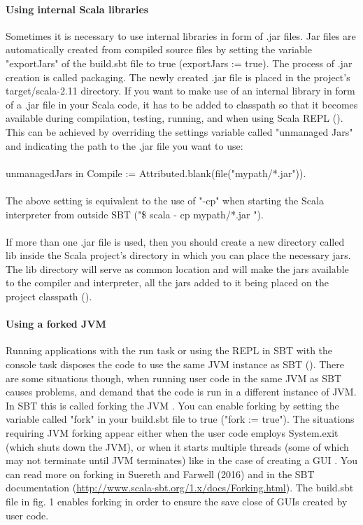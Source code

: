 \documentclass {article}
\begin{document}
\paragraph{Using internal Scala libraries}
Sometimes it is necessary to use internal libraries in form of .jar files.
 Jar files are automatically created from compiled source files by setting the variable "exportJars" of the build.sbt file to true (exportJars := true).
 The process of .jar creation is called packaging.
 The newly created .jar file is placed in the project's target/scala-2.11 directory.
 If you want to make use of an internal library in form of a .jar file in your Scala code, it has to be added to classpath so that it becomes available during compilation, testing, running, and when using Scala REPL (\cite{noauthor_sbt_2017}). 
This can be achieved by overriding the settings variable called "unmanaged Jars" and indicating the path to the .jar file you want to use:
\\
\\
unmanagedJars in Compile := Attributed.blank(file("mypath/*.jar")). 
\\
\\
The above setting is equivalent to the use of "-cp" when starting the Scala interpreter from outside SBT ("\$ scala - cp mypath/*.jar ").      
\\
\\
If more than one .jar file is used, then you should create a new directory called lib inside the Scala project's directory in which you can place the necessary jars. 
The lib directory will serve as common location and will make the jars available to the compiler and interpreter, all the jars added to it being placed on the project classpath (\cite{noauthor_sbt_2017}). 

\paragraph {Using a forked JVM}

Running applications with the run task or using the REPL in SBT with the console task disposes the code to use the same JVM instance as SBT (\cite{noauthor_sbt_2017}). 
There are some situations though, when running user code in the same JVM as SBT causes problems, and demand that the code is run in a different instance of JVM.
 In SBT this is called forking the JVM \cite{suereth_sbt_2016}.
 You can enable forking by setting the variable called "fork" in your build.sbt file to true ("fork := true").
 The situations requiring JVM forking appear either when the user code employs System.exit (which shuts down the JVM), or when it starts multiple threads (some of which may not terminate until JVM terminates) like in the case of creating a GUI \cite{noauthor_sbt_2017}.
 You can read more on forking in Suereth and Farwell (2016) and in the SBT documentation (\href{http://www.scala-sbt.org/1.x/docs/Forking.html}{http://www.scala-sbt.org/1.x/docs/Forking.html}).
 The build.sbt file in fig. 1 enables forking in order to ensure the save close of GUIs created by user code.      
\end{document}
